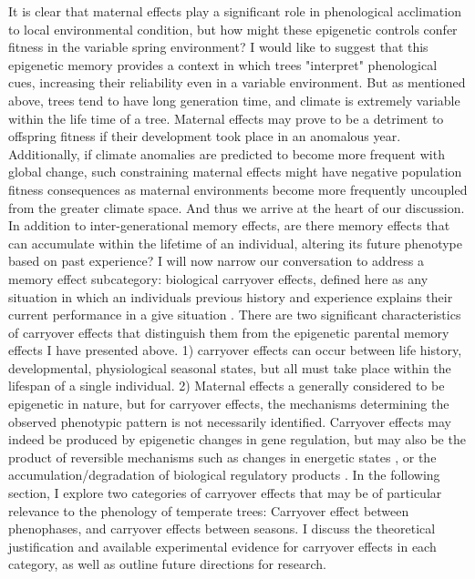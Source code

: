 \documentclass{article}\usepackage[]{graphicx}\usepackage[]{color}
\begin{document}
\par It is clear that maternal effects play a significant role in phenological acclimation to local environmental condition, but how might these epigenetic controls confer fitness in the variable spring environment? I would like to suggest that this epigenetic memory provides a context in which trees "interpret" phenological cues, increasing their reliability even in a variable environment. But as mentioned above, trees tend to have long generation time, and climate is extremely variable within the life time of a tree. Maternal effects may prove to be a detriment to offspring fitness if their development took place in an anomalous year. Additionally, if climate anomalies are predicted to become more frequent with global change, such constraining maternal effects might have negative population fitness consequences as maternal environments become more frequently uncoupled from the greater climate space. And thus we arrive at the heart of our discussion. In addition to inter-generational memory effects, are there memory effects that can accumulate within the lifetime of an individual, altering its future phenotype based on past experience? I will now narrow our conversation to address a memory effect subcategory: biological carryover effects, defined here as any situation in which an individuals previous history and experience explains their current performance in a give situation \citep{OConnor2014}. There are two significant characteristics of carryover effects that distinguish them from the epigenetic parental memory effects I have presented above. 1) carryover effects can occur between life history, developmental, physiological seasonal states, but all must take place within the lifespan of a single individual. 2) Maternal effects a generally considered to be epigenetic in nature, but for carryover effects, the mechanisms determining the observed phenotypic pattern is not necessarily identified. Carryover effects may indeed be produced by epigenetic changes in gene regulation, but may also be the product of reversible mechanisms such as changes in energetic states \citep{OConnor2014}, or the accumulation/degradation of biological regulatory products \citep{Gomory2014}. In the following section, I explore two categories of carryover effects that may be of particular relevance to the phenology of temperate trees: Carryover effect between phenophases, and carryover effects between seasons. I discuss the theoretical justification and available experimental evidence for carryover effects in each category, as well as outline future directions for research.
\end{document}
